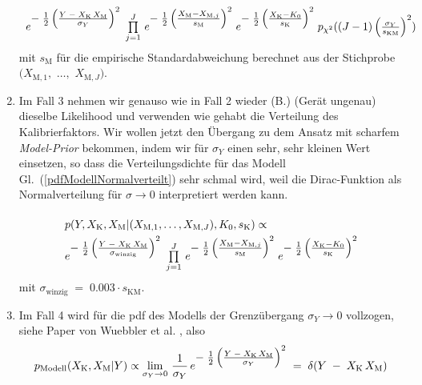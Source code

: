 \begin{enumerate}
\begin{equation}
\begin{array}{l}
e^{\textstyle-\;\frac{1}{2} \left(\frac{ Y \; - \; X_\mathrm{K} \, X_\mathrm{M}}{\sigma_Y} \right)^2}
\; \prod\limits_{j=1}^J \,
e^{\textstyle-\;\frac{1}{2} \left(\frac{ X_\mathrm{M} - X_{\mathrm{M},j} }{s_\mathrm{M}} \right)^2}
\;  e^{\textstyle-\;\frac{1}{2} \left(\frac{X_\mathrm{K} - K_0}{s_\mathrm{K}} \right)^2}
\; p_{\chi^2} ((J-1) \left(\frac{\sigma_Y}{s_\mathrm{KM}}\right)^2)
\end{array}
\label{PosteriorFall2}
\end{equation}
	mit $s_\mathrm{M}$ für die empirische Standardabweichung berechnet aus der Stichprobe
	$(X_{\mathrm{M},1},$ $\dots,$ $X_{\mathrm{M},J})$.
	\item Im Fall 3 nehmen wir genauso wie in Fall 2 wieder (B.) (\glqq Gerät ungenau\grqq)
	dieselbe Likelihood
	und verwenden wie gehabt die Verteilung des Kalibrierfaktors. Wir wollen jetzt den Übergang zu dem
	Ansatz mit scharfem \textsl{Model-Prior} bekommen, indem wir für $\sigma_Y$ einen sehr, sehr
	kleinen Wert einsetzen, so dass die Verteilungsdichte für das Modell
	Gl.~(\ref{pdfModellNormalverteilt}) sehr schmal wird, weil die Dirac-Funktion als
	Normalverteilung für $\sigma \rightarrow 0$ interpretiert werden kann.
\begin{equation}
\arraycolsep=2.0pt\def\arraystretch{2.0}
\begin{array}{l}
p(Y, X_\mathrm{K}, X_\mathrm{M} | (X_{\mathrm{M},1}, \dots, X_{\mathrm{M},J}), K_0, s_\mathrm{K}) \propto \\
e^{\T-\;\frac{1}{2} \left(\frac{ Y \; - \; X_\mathrm{K} \, X_\mathrm{M}}{\sigma_\mathrm{winzig}} \right)^2}
\; \prod\limits_{j=1}^J  \,
e^{\T-\;\frac{1}{2} \left(\frac{ X_\mathrm{M} - X_{\mathrm{M},j} }{s_\mathrm{M}} \right)^2}
\;  e^{\T-\;\frac{1}{2} \left(\frac{X_\mathrm{K} - K_0}{s_\mathrm{K}} \right)^2}
\end{array}
\label{PosteriorFall3}
\end{equation}
	mit $\sigma_\mathrm{winzig} \; = \; 0.003 \cdot s_\mathrm{KM}$.
	\item Im Fall 4 wird für die pdf des Modells der Grenzübergang
	$\sigma_Y \rightarrow 0$ vollzogen, siehe Paper von Wuebbler et al. 
	\cite{Wue08}, also
\begin{equation}
p_\mathrm{Modell} (X_\mathrm{K}, X_\mathrm{M} | Y) \propto
\lim\limits_{\sigma_Y \rightarrow 0} \, \frac{1}{\sigma_Y} \,
e^{\textstyle-\;\frac{1}{2} \left(\frac{ Y \; - \; X_\mathrm{K} \, X_\mathrm{M}}{\sigma_Y} \right)^2} \; = \;
\delta(Y \; - \; X_\mathrm{K} \, X_\mathrm{M})
\label{pdfModellDiracPeak}
\end{equation}

\end{enumerate}
